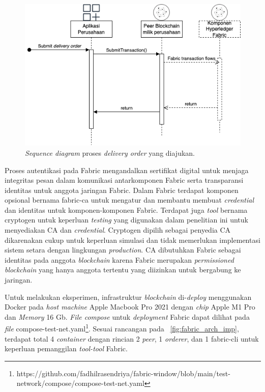 \begin{figure}
	\centering
	\includegraphics[width=\textwidth]{assets/pics/do_blockchain.drawio.png}
	\caption{\textit{Sequence diagram} proses \textit{delivery order} yang diajukan.}
	\label{fig:request_do_seq}
\end{figure}

Proses autentikasi pada Fabric mengandalkan sertifikat digital untuk menjaga integritas pesan dalam komunikasi antarkomponen Fabric serta transparansi identitas untuk anggota jaringan Fabric. Dalam Fabric terdapat komponen opsional bernama fabric-ca untuk mengatur dan membantu membuat \textit{credential} dan identitas untuk komponen-komponen Fabric. Terdapat juga \textit{tool} bernama cryptogen untuk keperluan \textit{testing} yang digunakan dalam penelitian ini untuk menyediakan CA dan \textit{credential}. Cryptogen dipilih sebagai penyedia CA dikarenakan cukup untuk keperluan simulasi dan tidak memerlukan implementasi sistem setara dengan lingkungan \textit{production}. CA dibutuhkan Fabric sebagai identitas pada anggota \textit{blockchain} karena Fabric merupakan \textit{permissioned blockchain} yang hanya anggota tertentu yang diizinkan untuk bergabung ke jaringan. 


Untuk melakukan eksperimen, infrastruktur \textit{blockchain} di-\textit{deploy} menggunakan Docker pada \textit{host machine} Apple Macbook Pro 2021 dengan \textit{chip} Apple M1 Pro dan \textit{Memory} 16 Gb. \textit{File compose} untuk \textit{deployment} Fabric dapat dilihat pada \textit{file} compose-test-net.yaml\footnote{https://github.com/fadhilrasendriya/fabric-window/blob/main/test-network/compose/compose-test-net.yaml}. Sesuai rancangan pada \pic~\ref{fig:fabric_arch_imp}, terdapat total 4 \textit{container} dengan rincian 2 \textit{peer}, 1 \textit{orderer}, dan 1 fabric-cli untuk keperluan pemanggilan \textit{tool-tool} Fabric.



